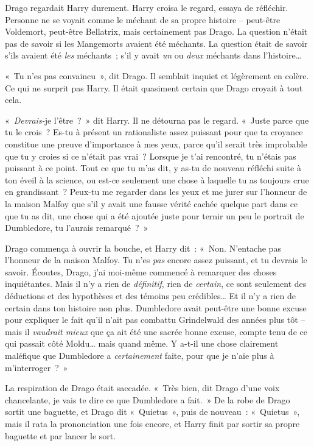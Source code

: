 Drago regardait Harry durement.
Harry croisa le regard, essaya de réfléchir.
Personne ne se voyait comme le méchant de sa propre histoire -- peut-être Voldemort, peut-être Bellatrix, mais certainement pas Drago.
La question n'était pas de savoir si les Mangemorts avaient été méchants.
La question était de savoir s'ils avaient été \emph{les} méchants~; s'il y avait \emph{un} ou \emph{deux} méchants dans l'histoire…

«~Tu n'es pas convaincu~», dit Drago.
Il semblait inquiet et légèrement en colère.
Ce qui ne surprit pas Harry.
Il était quasiment certain que Drago croyait à tout cela.

«~\emph{Devrais-}je l'être~?~»
dit Harry.
Il ne détourna pas le regard.
«~Juste parce que tu le crois~?
Es-tu à présent un rationaliste assez puissant pour que ta croyance constitue une preuve d'importance à mes yeux, parce qu'il serait très improbable que tu y croies si ce n'était pas vrai~?
Lorsque je t'ai rencontré, tu n'étais pas puissant à ce point.
Tout ce que tu m'as dit, y as-tu de nouveau réfléchi suite à ton éveil à la science, ou est-ce seulement une chose à laquelle tu as toujours crue en grandissant~?
Peux-tu me regarder dans les yeux et me jurer sur l'honneur de la maison Malfoy que s'il y avait une fausse vérité cachée quelque part dans ce que tu as dit, une chose qui a été ajoutée juste pour ternir un peu le portrait de Dumbledore, tu l'aurais remarqué~?~»

Drago commença à ouvrir la bouche, et Harry dit~: «~Non.
N'entache pas l'honneur de la maison Malfoy.
Tu n'es \emph{pas} encore assez puissant, et tu devrais le savoir.
Écoutes, Drago, j'ai moi-même commencé à remarquer des choses inquiétantes.
Mais il n'y a rien de \emph{définitif}, rien de \emph{certain}, ce sont seulement des déductions et des hypothèses et des témoins peu crédibles…
Et il n'y a rien de certain dans ton histoire non plus.
Dumbledore avait peut-être une bonne excuse pour expliquer le fait qu'il n'ait pas combattu Grindelwald des années plus tôt -- mais il \emph{vaudrait mieux} que ça ait été une sacrée bonne excuse, compte tenu de ce qui passait côté Moldu… mais quand même.
Y a-t-il une chose clairement maléfique que Dumbledore a \emph{certainement} faite, pour que je n'aie plus à m'interroger~?~»

La respiration de Drago était saccadée.
«~Très bien, dit Drago d'une voix chancelante, je vais te dire ce que Dumbledore a fait.~»
De la robe de Drago sortit une baguette, et Drago dit «~Quietus~», puis de nouveau~: «~Quietus~», mais il rata la prononciation une fois encore, et Harry finit par sortir sa propre baguette et par lancer le sort.

